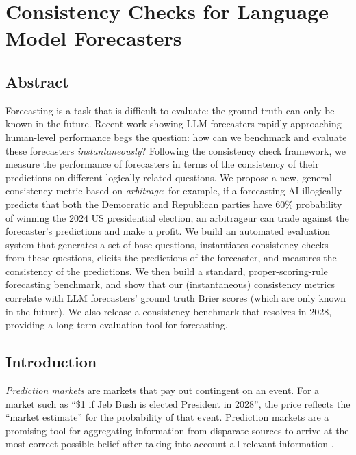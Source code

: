 \chapter{Consistency Checks for Language Model Forecasters}
\label{chap:consistency-checks}


\newcommand{\rebuttal}[1]{#1}
\newcommand{\rebuttaldeleted}[1]{}
\section*{Abstract}
Forecasting is a task that is difficult to evaluate: the ground truth can only be known in the future. Recent work showing LLM forecasters rapidly approaching human-level performance begs the question: how can we benchmark and evaluate these forecasters \textit{instantaneously}? Following the consistency check framework, we measure the performance of forecasters in terms of the consistency of their predictions on different logically-related questions. We propose a new, general consistency metric based on  \textit{arbitrage}: for example, if a forecasting AI illogically predicts that both the Democratic and Republican parties have 60\% probability of winning the 2024 US presidential election, an arbitrageur can trade against the forecaster's predictions and make a profit. We build an automated evaluation system that generates a set of base questions, instantiates consistency checks from these questions, elicits the predictions of the forecaster, and measures the consistency of the predictions. We then build a standard, proper-scoring-rule forecasting benchmark, and show that our (instantaneous) consistency metrics correlate with LLM forecasters' ground truth Brier scores (which are only known in the future). We also release a consistency benchmark that resolves in 2028, providing a long-term evaluation tool for forecasting.

\section{Introduction}

\emph{Prediction markets} are markets that pay out contingent on an event. For a market such as ``\$1 if Jeb Bush is elected President in 2028'', the price reflects the ``market estimate'' for the probability of that event. Prediction markets are a promising tool for aggregating information from disparate sources to arrive at the most correct possible belief after taking into account all relevant information \citep{arrowPromisePredictionMarkets2008, hansonLogarithmicMarketScoring2002}.


